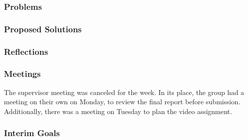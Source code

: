 \subsubsection{Problems}


\subsubsection{Proposed Solutions}


\subsubsection{Reflections}

    

\subsubsection{Meetings}

    The supervisor meeting was canceled for the week. In its place, the group had a meeting on their own on Monday, to review the final report before submission. Additionally, there was a meeting on Tuesday to plan the video assignment.

\subsubsection{Interim Goals}


